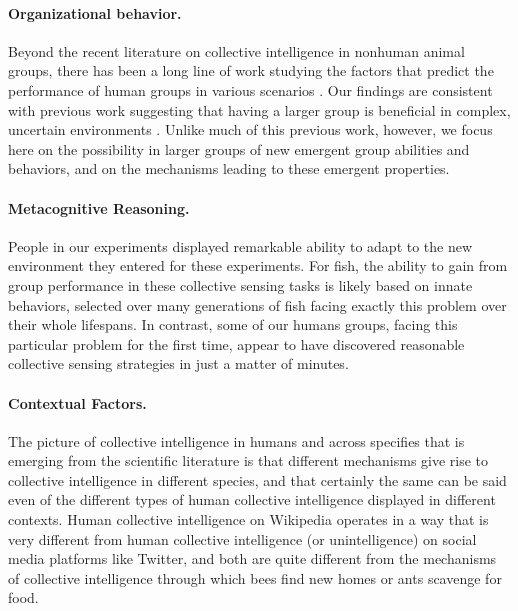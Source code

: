 \documentclass[12pt,letterpaper]{article}
\begin{document}
\paragraph{Organizational behavior.}


Beyond the recent literature on collective intelligence in nonhuman animal groups, there has been a long line of work studying the factors that predict the performance of human groups in various scenarios \cite{kerr_group_2004}.  
Our findings are consistent with previous work suggesting that having a larger group is beneficial in complex, uncertain environments \cite{stewart_meta-analytic_2006}.  
Unlike much of this previous work, however, we focus here on the possibility in larger groups of new emergent group abilities and behaviors, and on the mechanisms leading to these emergent properties.

\paragraph{Metacognitive Reasoning.}

People in our experiments displayed remarkable ability to adapt to the new environment they entered for these experiments. For fish, the ability to
gain from group performance in these collective sensing tasks is
likely based on innate behaviors, selected over many generations of
fish facing exactly this problem over their whole lifespans.  In
contrast, some of our humans groups, facing this particular problem
for the first time, appear to have discovered reasonable collective
sensing strategies in just a matter of minutes.


\paragraph{Contextual Factors.}

The picture of collective intelligence in humans and across specifies that is emerging from the scientific literature is that different mechanisms give rise to collective intelligence in different species, and that certainly the same can be said even of the different types of human collective intelligence displayed in different contexts.  Human collective intelligence on Wikipedia operates in a way that is very different from human collective intelligence (or unintelligence) on social media platforms like Twitter, and both are quite different from the mechanisms of collective intelligence through which bees find new homes or ants scavenge for food. 
\end{document}

